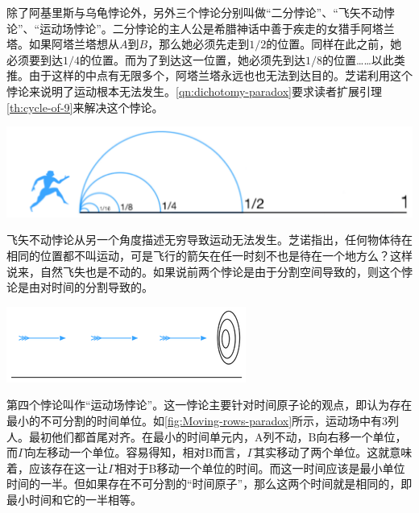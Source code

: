 \documentclass[b5paper]{ctexart}
\begin{document}
\begin{mdframed}
除了阿基里斯与乌龟悖论外，另外三个悖论分别叫做“二分悖论”、“飞矢不动悖论”、“运动场悖论”。二分悖论的主人公是希腊神话中善于疾走的女猎手阿塔兰塔。如果阿塔兰塔想从$A$到$B$，那么她必须先走到$1/2$的位置。同样在此之前，她必须要到达$1/4$的位置。而为了到达这一位置，她必须先到达$1/8$的位置……以此类推。由于这样的中点有无限多个，阿塔兰塔永远也也无法到达目的。芝诺利用这个悖论来说明了运动根本无法发生。\cref{qn:dichotomy-paradox}要求读者扩展引理\ref{th:cycle-of-9}来解决这个悖论。

\begin{center}
 \includegraphics[scale=0.4]{img/dichotomy-paradox}
 \label{fig:dichotomy-paradox}
\end{center}

飞矢不动悖论从另一个角度描述无穷导致运动无法发生。芝诺指出，任何物体待在相同的位置都不叫运动，可是飞行的箭矢在任一时刻不也是待在一个地方么？这样说来，自然飞失也是不动的。如果说前两个悖论是由于分割空间导致的，则这个悖论是由对时间的分割导致的。

\begin{center}
 \includegraphics[scale=0.4]{img/arrow-paradox}
 \label{fig:Arrow-paradox}
\end{center}

第四个悖论叫作“运动场悖论”。这一悖论主要针对时间原子论的观点，即认为存在最小的不可分割的时间单位。如\cref{fig:Moving-rows-paradox}所示，运动场中有3列人。最初他们都首尾对齐。在最小的时间单元内，A列不动，B向右移一个单位，而$\Gamma$向左移动一个单位。容易得知，相对B而言，$\Gamma$其实移动了两个单位。这就意味着，应该存在这一让$\Gamma$相对于B移动一个单位的时间。而这一时间应该是最小单位时间的一半。但如果存在不可分割的“时间原子”，那么这两个时间就是相同的，即最小时间和它的一半相等。


\end{mdframed}
\end{document}
